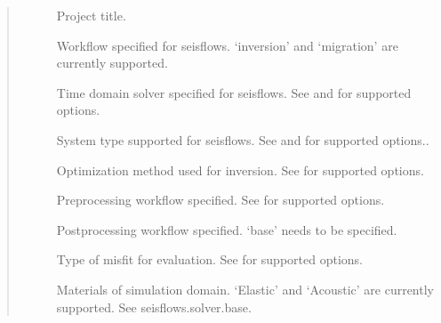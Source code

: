 \documentclass[letterpaper,10pt,english]{sphinxmanual}
\begin{document}
\begin{quote}\begin{description}
\item[{}] \leavevmode
Project title.

\item[{}] \leavevmode
Workflow specified for seisflows. ‘inversion’ and ‘migration’ are currently supported.

\item[{}] \leavevmode
Time domain solver specified for seisflows. See {\hyperref[\detokenize{main/usage:solver}]{}} and {\hyperref[\detokenize{ref/seisflows.solver:sfsolver}]{}} for supported options.

\item[{}] \leavevmode
System type supported for seisflows. See {\hyperref[\detokenize{main/usage:system}]{}} and {\hyperref[\detokenize{ref/seisflows.system:sfsystem}]{}} for supported options..

\item[{}] \leavevmode
Optimization method used for inversion. See {\hyperref[\detokenize{ref/seisflows.optimize:sfoptimize}]{}} for supported options.

\item[{}] \leavevmode
Preprocessing workflow specified. See {\hyperref[\detokenize{ref/seisflows.preprocess:sfpreprocess}]{}} for supported options.

\item[{}] \leavevmode
Postprocessing workflow specified. ‘base’ needs to be specified.

\item[{}] \leavevmode
Type of misfit for evaluation. See {\hyperref[\detokenize{ref/seisflows.plugins:sfmisfit}]{}} for supported options.

\item[{}] \leavevmode
Materials of simulation domain. ‘Elastic’ and ‘Acoustic’ are currently supported. See seisflows.solver.base.

\end{description}\end{quote}
\end{document}
